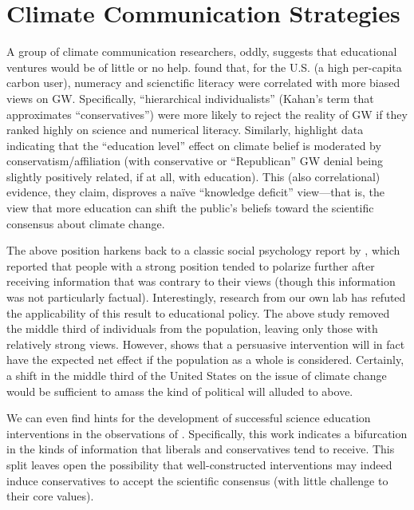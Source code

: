 
\section{Climate Communication Strategies}
\label{sec:comm-strategies}

A group of climate communication researchers, oddly, suggests that educational
ventures would be of little or no help. \textcite{kahan_polarizing_2012} found
that, for the U.S. (a high per-capita carbon user), numeracy and scienctific
literacy were correlated with more biased views on GW. Specifically,
“hierarchical individualists” (Kahan's term that approximates “conservatives”)
were more likely to reject the reality of GW if they ranked highly on science
and numerical literacy. Similarly, \textcite{mccright_politicization_2011}
highlight data indicating that the ``education level'' effect on climate belief
is moderated by conservatism/affiliation (with conservative or ``Republican'' GW
denial being slightly positively related, if at all, with education). This (also
correlational) evidence, they claim, disproves a naïve ``knowledge deficit''
view---that is, the view that more education can shift the public's beliefs
toward the scientific consensus about climate change. 

The above position harkens back to a classic social psychology report by
\textcite{lord_biased_1979}, which reported that people with a strong position
tended to polarize further after receiving information that was contrary to
their views (though this information was  not particularly factual).
Interestingly, research from our own lab has refuted the applicability of this
result to educational policy. The above study removed the middle third of
individuals from the population, leaving only those with relatively strong
views. However, \textcite{nelson_criminal_2007} shows that a persuasive
intervention will in fact have the expected net effect if the population as a
whole is considered. Certainly, a shift in the middle third of the United States
on the issue of climate change would be sufficient to amass the kind of
political will alluded to above.

We can even find hints for the development of successful science education
interventions in the observations of \textcite{mccright_politicization_2011}.
Specifically, this work indicates a bifurcation in the kinds of information that
liberals and conservatives tend to receive.  This split leaves open the
possibility that well-constructed interventions may indeed induce conservatives
to accept the scientific consensus (with little challenge to their core values).  

